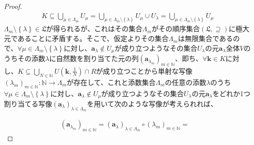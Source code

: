 \documentclass[dvipdfmx]{jsarticle}
\begin{document}
\begin{proof}
\begin{align*}
K \subseteq \bigcup_{\mu \in \varLambda_{m}} U_{\mu} = \bigcup_{\mu \in \varLambda_{m} \setminus \left\{ \lambda \right\}} U_{\mu} \cup U_{\lambda} = \bigcup_{\mu \in \varLambda_{m} \setminus \left\{ \lambda \right\}} U_{\mu}
\end{align*}
$\varLambda_{m} \setminus \left\{ \lambda \right\}\in \mathfrak{L}$が得られるが、これはその集合$\varLambda_{m}$がその順序集合$\left( \mathfrak{L, \supseteq} \right)$に極大元であることに矛盾する。そこで、仮定よりその集合$\varLambda_{m}$は無限集合であるので、$\forall\mu \in \varLambda_{m} \setminus \left\{ \lambda \right\}$に対し、$\mathbf{a}_{\lambda} \notin U_{\mu}$が成り立つようなその集合$U_{\lambda}$の元$\mathbf{a}_{\lambda}$全体$V$のうちその添数$\lambda$に自然数を割り当てた元の列$\left( \mathbf{a}_{\lambda_{m}} \right)_{m \in \mathbb{N}}$、即ち、$\forall\mathbf{k} \in K$に対し、$K \subseteq \bigcup_{N \in \mathbb{N}} {U\left( \mathbf{k},\frac{1}{N} \right) \cap R}$が成り立つことから単射な写像$\left( \lambda_{m} \right)_{m \in \mathbb{N}}:\mathbb{N} \rightarrow \varLambda_{m}$が存在して、これと添数集合$\varLambda_{m}$の任意の添数$\lambda$のうち$\forall\mu \in \varLambda_{m} \setminus \left\{ \lambda \right\}$に対し、$\mathbf{a}_{\lambda} \notin U_{\mu}$が成り立つようなその集合$U_{\lambda}$の元$\mathbf{a}_{\lambda}$をどれか1つ割り当てる写像$\left( \mathbf{a}_{\lambda} \right)_{\lambda \in \varLambda_{m}}$を用いて次のような写像が考えられれば、
\begin{comment}
\begin{align*}
\left( \mathbf{a}_{\lambda_{m}} \right)_{m \in \mathbb{N}} = \left( \mathbf{a}_{\lambda} \right)_{\lambda \in \varLambda_{m}} \circ \left( \lambda_{m} \right)_{m \in \mathbb{N}} = \text{
\begin{tikzpicture}
  \node (x) at (0, 0) {};
  \node (a) at (0, 1) {$\mathbb{N} $};
  \node (b) at (2, 1) {$\varLambda_m $};
  \node (c) at (4, 1) {$V$};
  \node (d) at (0, 0) {$m$};
  \node (e) at (2, 0) {$\lambda_{m}$};
  \node (f) at (4, 0) {$\mathbf{a}_{\lambda_{m}}$};
  \node[rotate=90] (x) at (0, 0.5) {$\in $};
  \node[rotate=90] (x) at (2, 0.5) {$\in $};
  \node[rotate=90] (x) at (4, 0.5) {$\in $};
\end{tikzpicture}
}
\end{align*}
\end{comment}
\begin{align*}
\left( \mathbf{a}_{\lambda_{m}} \right)_{m \in \mathbb{N}} = \left( \mathbf{a}_{\lambda} \right)_{\lambda \in \varLambda_{m}} \circ \left( \lambda_{m} \right)_{m \in \mathbb{N}} =\begin{matrix}

\end{matrix}
\end{align*}
\end{proof}
\end{document}
